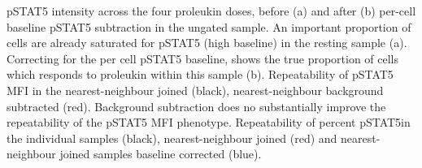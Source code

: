 %
%
{ pSTAT5 intensity across the four proleukin doses, before (a) and after (b) per-cell baseline pSTAT5 subtraction in the ungated sample.}
{
  An important proportion of cells are already saturated for pSTAT5 (high baseline) in the resting sample (a).
  Correcting for the per cell pSTAT5 baseline, shows the true proportion of cells which responds to proleukin within this sample (b).
}
%
{ Repeatability of pSTAT5 MFI in the nearest-neighbour joined (black), nearest-neighbour background subtracted (red). }
{
  Background subtraction does no substantially improve the repeatability of the pSTAT5 MFI phenotype.
}
%
{ Repeatability of percent pSTAT5\positive in the individual samples (black), nearest-neighbour joined (red) and nearest-neighbour joined samples baseline corrected (blue). }
{
}
%
\clearpage



